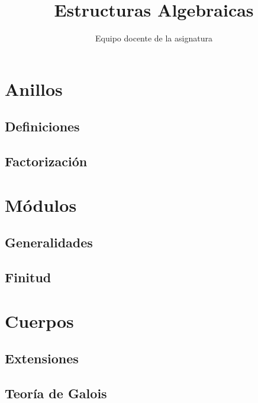 \documentclass[12pt]{book}
\title{Estructuras Algebraicas}
\author{Equipo docente de la asignatura}
\let\section\chapter
\theoremstyle{definition}
\theoremstyle{remark}
\numberwithin{equation}{subsection}
\numberwithin{section}{part}
\numberwithin{equation}{section}
\begin{document}
 
\maketitle

\tableofcontents

\part{Anillos}



\section{Definiciones}



\section{Factorización}



\part{Módulos}



\section{Generalidades}



\section{Finitud}



\part{Cuerpos}



\section{Extensiones}



\section{Teoría de Galois}


\end{document}
